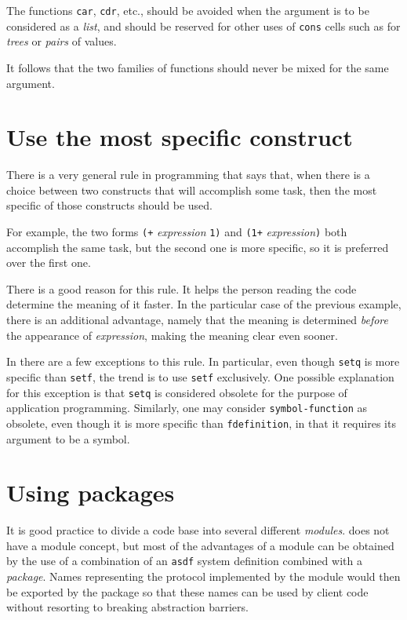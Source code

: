 The functions \texttt{car}, \texttt{cdr}, etc., should be avoided when
the argument is to be considered as a \emph{list}, and should be
reserved for other uses of \texttt{cons} cells such as for
\emph{trees} or \emph{pairs} of values.

It follows that the two families of functions should never be mixed
for the same argument.

\section{Use the most specific construct}

There is a very general rule in programming that says that, when there
is a choice between two constructs that will accomplish some task,
then the most specific of those constructs should be used.

For example, the two forms \texttt{(+} \textit{expression} \texttt{1)}
and \texttt{(1+} \textit{expression}\texttt{)} both accomplish the
same task, but the second one is more specific, so it is preferred over
the first one.

There is a good reason for this rule.  It helps the person reading the
code determine the meaning of it faster.  In the particular case of
the previous example, there is an additional advantage, namely that
the meaning is determined \emph{before} the appearance of
\textit{expression}, making the meaning clear even sooner.

In \commonlisp{} there are a few exceptions to this rule. In
particular, even though \texttt{setq} is more specific than
\texttt{setf}, the trend is to use \texttt{setf} exclusively.  One
possible explanation for this exception is that \texttt{setq} is
considered obsolete for the purpose of application programming.
Similarly, one may consider \texttt{symbol-function} as obsolete, even
though it is more specific than \texttt{fdefinition}, in that it
requires its argument to be a symbol.

\section{Using packages}
\label{sec-coding-style-using-packages}

It is good practice to divide a code base into several different
\emph{modules}.  \commonlisp{} does not have a module concept, but
most of the advantages of a module can be obtained by the use of a
combination of an \texttt{asdf} system definition combined with a
\commonlisp{} \emph{package}.  Names representing the protocol
implemented by the module would then be exported by the package so
that these names can be used by client code without resorting to
breaking abstraction barriers.

